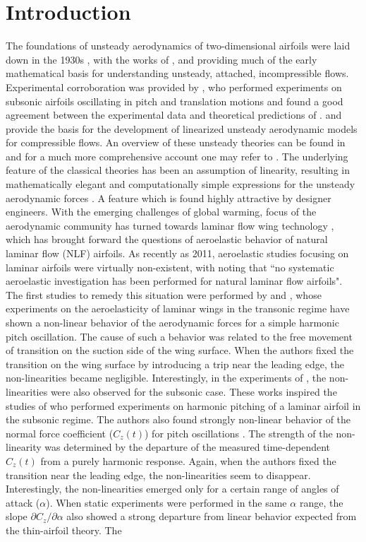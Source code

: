 \section{Introduction}
The foundations of unsteady aerodynamics of two-dimensional airfoils were laid down in the 1930s \citep{leishman00}, with the works of \cite{glauert30}, \cite{theodorsen35} and \cite{karman38} providing much of the early mathematical basis for understanding unsteady, attached, incompressible flows. Experimental corroboration was provided by \cite{halfman52}, who performed experiments on subsonic airfoils oscillating in pitch and translation motions and found a good agreement between the experimental data and theoretical predictions of \cite{theodorsen35}. \cite{lomax52} and \cite{lomax53} provide the basis for the development of linearized unsteady aerodynamic models for compressible flows. An overview of these unsteady theories can be found in \cite{leishman00} and for a much more comprehensive account one may refer to \cite{bisplingoff00}. The underlying feature of the classical theories has been an assumption of linearity, resulting in mathematically elegant and computationally simple expressions for the unsteady aerodynamic forces \citep{leishman00}. A feature which is found highly attractive by designer engineers. With the emerging challenges of global warming, focus of the aerodynamic community has turned towards laminar flow wing technology \citep{green08}, which has brought forward the questions of aeroelastic behavior of natural laminar flow (NLF) airfoils. As recently as 2011, aeroelastic studies focusing on laminar airfoils were virtually non-existent, with \cite{mai11} noting that ``no systematic aeroelastic investigation has been performed for natural laminar flow airfoils". The first studies to remedy this situation were performed by \cite{mai11} and \cite{hebler13}, whose experiments on the aeroelasticity of laminar wings in the transonic regime have shown a non-linear behavior of the aerodynamic forces for a simple harmonic pitch oscillation. The cause of such a behavior was related to the free movement of transition on the suction side of the wing surface. When the authors fixed the transition on the wing surface by introducing a trip near the leading edge, the non-linearities became negligible. Interestingly, in the experiments of \cite{mai11}, the non-linearities were also observed for the subsonic case. These works inspired the studies of \cite{lokattthesis} who performed experiments on harmonic pitching of a laminar airfoil in the subsonic regime. The authors also found strongly non-linear behavior of the normal force coefficient ($C_{z}(t)$) for pitch oscillations \citep{lokattthesis}. The strength of the non-linearity was determined by the departure of the measured time-dependent $C_{z}(t)$ from a purely harmonic response. Again, when the authors fixed the transition near the leading edge, the non-linearities seem to disappear. Interestingly, the non-linearities emerged only for a certain range of angles of attack ($\alpha$). When static experiments were performed in the same $\alpha$ range, the slope $\partial C_{z}/\partial\alpha$ also showed a strong departure from linear behavior expected from the thin-airfoil theory. The 